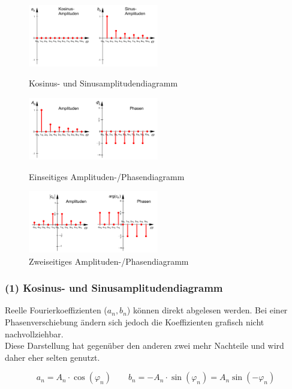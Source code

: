 \begin{figure}[htbp]
	\centering
	\begin{minipage}[b]{5.7cm}
		\includegraphics[width=5.7cm]{./bilder/spektren_cossin.png}
		\caption{Kosinus- und Sinusamplitudendiagramm} 
	\end{minipage}
	\hspace{0.5cm}
	\begin{minipage}[b]{5.7cm}
		\includegraphics[width=5.7cm]{./bilder/spektren_einseitig.png} 
		\caption{Einseitiges Amplituden-/Phasendiagramm} 
	\end{minipage}
	\hspace{0.5cm}
	\begin{minipage}[b]{5.7cm}
		\includegraphics[width=5.7cm]{./bilder/spektren_zweiseitig.png} 
		\caption{Zweiseitiges Amplituden-/Phasendiagramm} 
	\end{minipage}
\end{figure}

\subsubsection{(1) Kosinus- und Sinusamplitudendiagramm} 
Reelle Fourierkoeffizienten ($a_n, b_n$) können direkt abgelesen werden. 
Bei einer Phasenverschiebung ändern sich jedoch die Koeffizienten grafisch nicht nachvollziehbar. \\
Diese Darstellung hat gegenüber den anderen zwei mehr Nachteile und wird daher eher selten genutzt.

$$a_n = A_n \cdot \cos(\varphi_n) \qquad b_n = -A_n \cdot \sin(\varphi_n) = A_n \sin(-\varphi_n)$$


